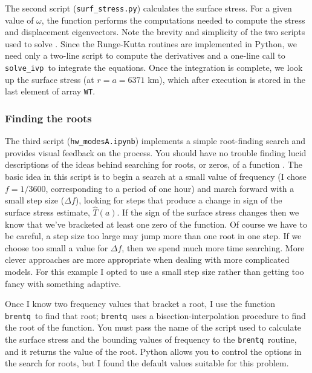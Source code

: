 \documentclass[11pt,titlepage,fleqn]{article}
\newcommand{\tfilemain}{{\tt hw\_modesA.ipynb}}
\newcommand{\tfiless}{{\tt surf\_stress.py}}
\newcommand{\rfind}{{\tt brentq}}
\newcommand{\sfind}{{\tt solve\_ivp}}
\begin{document}
The second script (\tfiless) calculates the surface stress. For a given value of $\omega$, the function performs the computations needed to compute the stress and displacement eigenvectors. Note the brevity and simplicity of the two scripts used to solve . Since the Runge-Kutta routines are implemented in Python, we need only a two-line script to compute the derivatives and a one-line call to \sfind\ to integrate the equations. Once the integration is complete, we look up the surface stress (at $r = a = 6371$ km), which after execution is stored in the last element of array \verb+WT+.

\subsubsection{Finding the roots}

The third script (\tfilemain) implements a simple root-finding search and provides visual feedback on the process. You should have no trouble finding lucid descriptions of the ideas behind searching for roots, or zeros, of a function \citep[\eg][]{Press1988}. The basic idea in this script is to begin a search at a small value of frequency (I chose $f = 1/3600$, corresponding to a period of one hour) and march forward with a small step size ($\Delta f$), looking for steps that produce a change in sign of the surface stress estimate, $\hat{T}(a)$. If the sign of the surface stress changes then we know that we’ve bracketed at least one zero of the function. Of course we have to be careful, a step size too large may jump more than one root in one step. If we choose too small a value for $\Delta f$, then we spend much more time searching. More clever approaches are more appropriate when dealing with more complicated models. For this example I opted to use a small step size rather than getting too fancy with something adaptive.

Once I know two frequency values that bracket a root, I use the function \rfind\ to find that root; \rfind\ uses a bisection-interpolation procedure to find the root of the function.
You must pass the name of the script used to calculate the surface stress and the bounding values of frequency to the \rfind\ routine, and it returns the value of the root. Python allows you to control the options in the search for roots, but I found the default values suitable for this problem.

\end{document}
